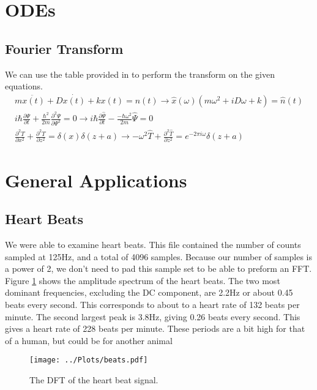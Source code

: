 \section{ODEs}
\subsection{Fourier Transform}
We can use the table provided in to perform the transform on the given equations.
\begin{eqnarray*}
m\ddot{x(t)} + D\dot{x(t)} + kx(t) = n(t) \rightarrow \hat{x}(\omega)(m\omega^{2} + iD\omega + k) = \hat{n}(t) \\
i\hbar \frac{\partial \Psi }{\partial t} + \frac{\hbar^{2}}{2m} \frac{\partial^2 \Psi}{\partial \Psi^2} = 0\rightarrow i\hbar \frac{\partial \hat{\Psi}}{\partial t} - \frac{-\hbar \omega^2}{2m}\hat{\Psi} = 0 \\
\frac{\partial^2 T}{\partial x^2} + \frac{\partial^2 T}{\partial z^2} = \delta (x) \delta(z+a) \rightarrow -\omega^2 \hat{T} + \frac{\partial^2 \hat{T}}{\partial z^2} = e^{-2\pi i \omega}\delta (z+a)
\end{eqnarray*}


\section{General Applications}
\subsection{Heart Beats}

We were able to examine heart beats. 
This file contained the number of counts sampled at 125Hz, and a total of 4096 samples. 
Because our number of samples is a power of 2, we don't need to pad this sample set to be able to preform an FFT. 
Figure \ref{fig:heart_beat} shows the amplitude spectrum of the heart beats. 
The two most dominant frequencies, excluding the DC component, are 2.2Hz or about 0.45 beats every second. 
This corresponds to about to a heart rate of 132 beats per minute. 
The second largest peak is 3.8Hz, giving 0.26 beats every second. 
This gives a heart rate of 228 beats per minute. 
These periods are a bit high for that of a human, but could be for another animal
\begin{figure}[ht]
    \centering
    \texttt{[image: ../Plots/beats.pdf]}
    \caption{The DFT of the heart beat signal.}
    \label{fig:heart_beat}
\end{figure}

